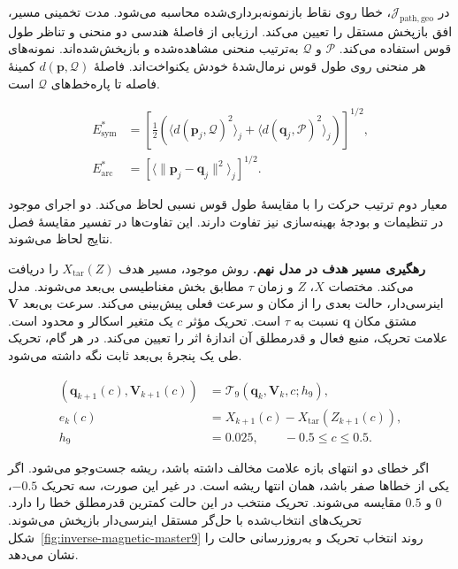 در $\mathcal J_{\mathrm{path,geo}}$، خطا روی نقاط بازنمونه‌برداری‌شده محاسبه می‌شود.
مدت تخمینی مسیر، افق بازپخش مستقل را تعیین می‌کند.
ارزیابی از فاصلهٔ هندسی دو منحنی و تناظر طول قوس استفاده می‌کند.
$\mathcal P$ و $\mathcal Q$ به‌ترتیب منحنی مشاهده‌شده و بازپخش‌شده‌اند.
نمونه‌های هر منحنی روی طول قوس نرمال‌شدهٔ خودش یکنواخت‌اند.
فاصلهٔ $d(\mathbf p,\mathcal Q)$ کمینهٔ فاصله تا پاره‌خط‌های $\mathcal Q$ است.

\begin{equation}
\begin{aligned}
E_{\mathrm{sym}}^*
&=\left[
\tfrac12\left(
\langle d(\mathbf p_j,\mathcal Q)^2\rangle_j
+\langle d(\mathbf q_j,\mathcal P)^2\rangle_j
\right)\right]^{1/2},\\
E_{\mathrm{arc}}^*
&=\left[\langle\|\mathbf p_j-\mathbf q_j\|^2\rangle_j\right]^{1/2}.
\end{aligned}
\label{eq:inverse-flow-geometry-errors}
\end{equation}

معیار دوم ترتیب حرکت را با مقایسهٔ طول قوس نسبی لحاظ می‌کند.
دو اجرای موجود در تنظیمات و بودجهٔ بهینه‌سازی نیز تفاوت دارند.
این تفاوت‌ها در تفسیر مقایسهٔ فصل نتایج لحاظ می‌شوند.

\label{sec:inverse-magnetic-drive}

\textbf{رهگیری مسیر هدف در مدل نهم.}
روش موجود، مسیر هدف $X_{\mathrm{tar}}(Z)$ را دریافت می‌کند.
مختصات $X$، $Z$ و زمان $\tau$ مطابق بخش مغناطیسی بی‌بعد می‌شوند.
مدل اینرسی‌دار، حالت بعدی را از مکان و سرعت فعلی پیش‌بینی می‌کند.
سرعت بی‌بعد $\mathbf V$ مشتق مکان $\mathbf q$ نسبت به $\tau$ است.
تحریک مؤثر $c$ یک متغیر اسکالر و محدود است.
علامت تحریک، منبع فعال و قدرمطلق آن اندازهٔ اثر را تعیین می‌کند.
در هر گام، تحریک طی یک پنجرهٔ بی‌بعد ثابت نگه داشته می‌شود.

\begin{equation}
\begin{aligned}
(\mathbf q_{k+1}(c),\mathbf V_{k+1}(c))
&=\mathcal T_9(\mathbf q_k,\mathbf V_k,c;h_9),\\
e_k(c)&=X_{k+1}(c)-X_{\mathrm{tar}}(Z_{k+1}(c)),\\
h_9&=0.025,\qquad -0.5\le c\le0.5 .
\end{aligned}
\label{eq:inverse-master9-tracking}
\end{equation}

اگر خطای دو انتهای بازه علامت مخالف داشته باشد، ریشه جست‌وجو می‌شود.
اگر یکی از خطاها صفر باشد، همان انتها ریشه است.
در غیر این صورت، سه تحریک $-0.5$، $0$ و $0.5$ مقایسه می‌شوند.
تحریک منتخب در این حالت کمترین قدرمطلق خطا را دارد.
تحریک‌های انتخاب‌شده با حل‌گر مستقل اینرسی‌دار  بازپخش می‌شوند.
شکل~\ref{fig:inverse-magnetic-master9} روند انتخاب تحریک و به‌روزرسانی حالت را نشان می‌دهد.

